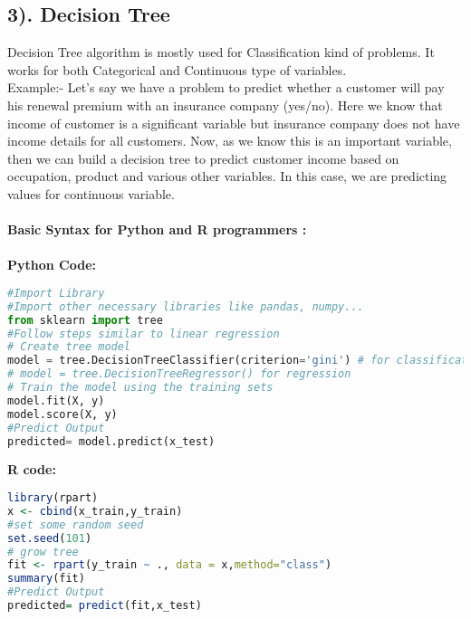 \documentclass[Proceedings]{ascelike}
\begin{document}
\subsection{3). Decision Tree}
Decision Tree algorithm is mostly used for Classification kind of problems. It works for both Categorical and Continuous type of variables.\\

Example:- Let’s say we have a problem to predict whether a customer will pay his renewal premium with an insurance company (yes/no). Here we know that income of customer is a significant variable but insurance company does not have income details for all customers. Now, as we know this is an important variable, then we can build a decision tree to predict customer income based on occupation, product and various other variables. In this case, we are predicting values for continuous variable.\\\\
\textbf{Basic Syntax for Python and R programmers :}\\
\\\textbf{Python Code:}
\begin{lstlisting}[language=Python]
#Import Library
#Import other necessary libraries like pandas, numpy...
from sklearn import tree
#Follow steps similar to linear regression
# Create tree model 
model = tree.DecisionTreeClassifier(criterion='gini') # for classification, here you can change the algorithm as gini or entropy (information gain) by default it is gini  
# model = tree.DecisionTreeRegressor() for regression
# Train the model using the training sets 
model.fit(X, y)
model.score(X, y)
#Predict Output
predicted= model.predict(x_test)
\end{lstlisting}
\textbf{R code:}
\begin{lstlisting}[language=R]
library(rpart)
x <- cbind(x_train,y_train)
#set some random seed
set.seed(101)
# grow tree 
fit <- rpart(y_train ~ ., data = x,method="class")
summary(fit)
#Predict Output 
predicted= predict(fit,x_test)
\end{lstlisting}
\end{document}
